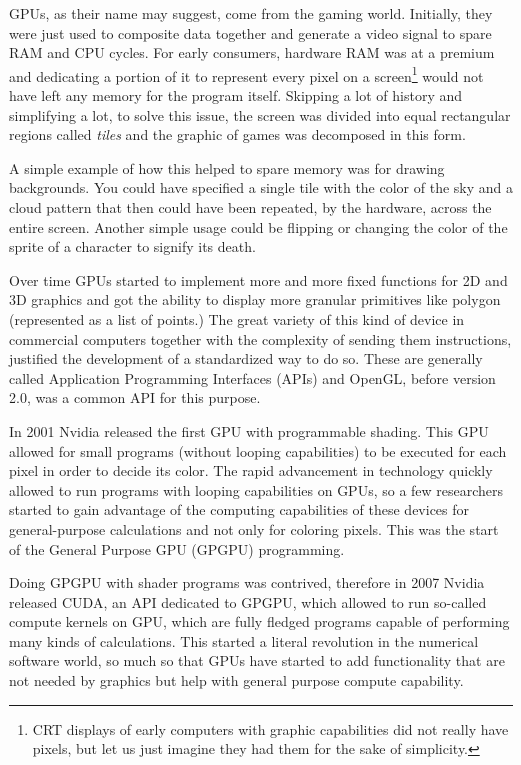 \documentclass{sapthesis}
\begin{document}

GPUs, as their name may suggest, come from the gaming world. Initially, they
were just used to composite data together and generate a video signal to spare
RAM and CPU cycles. For early consumers, hardware RAM was at a premium and
dedicating a portion of it to represent every pixel on a screen\footnote{CRT
displays of early computers with graphic capabilities did not really have
pixels, but let us just imagine they had them for the sake of simplicity.} would
not have left any memory for the program itself. Skipping a lot of history and
simplifying a lot, to solve this issue, the screen was divided into equal
rectangular regions called \emph{tiles} and the graphic of games was decomposed
in this form.

A simple example of how this helped to spare memory was for drawing backgrounds.
You could have specified a single tile with the color of the sky and a cloud
pattern that then could have been repeated, by the hardware, across the entire
screen. Another simple usage could be flipping or changing the color of the
sprite of a character to signify its death.

Over time GPUs started to implement more and more fixed functions for 2D and 3D
graphics and got the ability to display more granular primitives like polygon
(represented as a list of points.) The great variety  of this kind of device in
commercial computers together with the complexity of sending them instructions,
justified the development of a standardized way to do so. These are generally
called Application Programming Interfaces (APIs) and OpenGL, before
version 2.0, was a common API for this purpose.

In 2001 Nvidia released the first GPU with programmable shading. This GPU
allowed for small programs (without looping capabilities) to be executed for
each pixel in order to decide its color. The rapid advancement in technology
quickly allowed to run programs with looping capabilities on GPUs, so a few
researchers started to gain advantage of the computing capabilities of these
devices for general-purpose calculations and not only for coloring pixels. This
was the start of the General Purpose GPU (GPGPU) programming.

Doing GPGPU with shader programs was contrived, therefore in 2007 Nvidia
released CUDA, an API dedicated to GPGPU, which allowed to run so-called compute
kernels on GPU, which are fully fledged programs capable of performing many kinds
of calculations. This started a literal revolution in the numerical software
world, so much so that GPUs have started to add functionality that are not
needed by graphics but help with general purpose compute capability.
\end{document}
